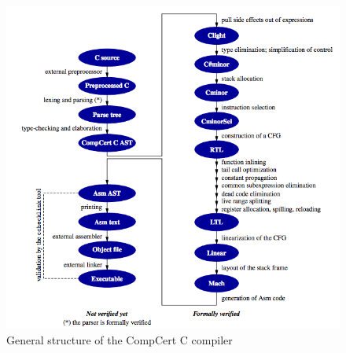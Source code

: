 \begin{figure}
\begin{center}
\includegraphics[width=\textwidth]{src/general-structure.png}
\end{center}
\label{fig:structure}
\caption{General structure of the CompCert C compiler~\cite{refman}}
\end{figure}
